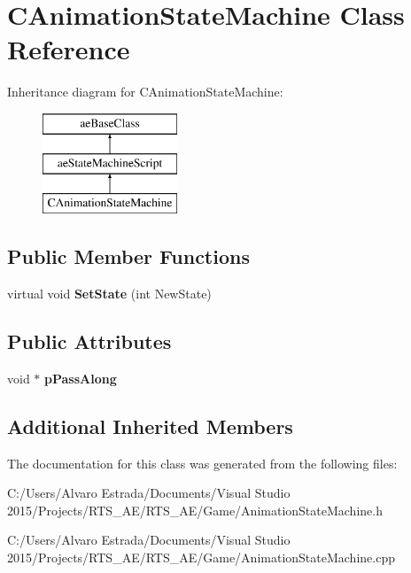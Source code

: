 \hypertarget{class_c_animation_state_machine}{}\section{C\+Animation\+State\+Machine Class Reference}
\label{class_c_animation_state_machine}
Inheritance diagram for C\+Animation\+State\+Machine\+:\begin{figure}[H]
\begin{center}
\leavevmode
\includegraphics[height=3.000000cm]{class_c_animation_state_machine}
\end{center}
\end{figure}
\subsection*{Public Member Functions}
\begin{DoxyCompactItemize}
\item 
virtual void {\bfseries Set\+State} (int New\+State)\hypertarget{class_c_animation_state_machine_a5292c07ee3336f9ce812530ba2e9af45}{}\label{class_c_animation_state_machine_a5292c07ee3336f9ce812530ba2e9af45}

\end{DoxyCompactItemize}
\subsection*{Public Attributes}
\begin{DoxyCompactItemize}
\item 
void $\ast$ {\bfseries p\+Pass\+Along}\hypertarget{class_c_animation_state_machine_a010a4f14ebd53dfb297dee39e570c188}{}\label{class_c_animation_state_machine_a010a4f14ebd53dfb297dee39e570c188}

\end{DoxyCompactItemize}
\subsection*{Additional Inherited Members}


The documentation for this class was generated from the following files\+:\begin{DoxyCompactItemize}
\item 
C\+:/\+Users/\+Alvaro Estrada/\+Documents/\+Visual Studio 2015/\+Projects/\+R\+T\+S\+\_\+\+A\+E/\+R\+T\+S\+\_\+\+A\+E/\+Game/Animation\+State\+Machine.\+h\item 
C\+:/\+Users/\+Alvaro Estrada/\+Documents/\+Visual Studio 2015/\+Projects/\+R\+T\+S\+\_\+\+A\+E/\+R\+T\+S\+\_\+\+A\+E/\+Game/Animation\+State\+Machine.\+cpp\end{DoxyCompactItemize}
